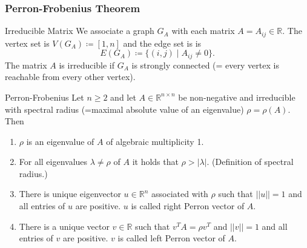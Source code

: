 \documentclass{panikzettel}
\begin{document}

\subsubsection{Perron-Frobenius Theorem}

\begin{defi}{Irreducible Matrix}
We associate a graph $G_A$ with each matrix $A=A_{ij}\in\mathbb{R}$. The vertex set is $V(G_A)\coloneqq [1,n]$ and the edge set is is
\[
E(G_A)\coloneqq \{(i,j)\mid A_{ij}\neq 0 \}.
\]
The matrix $A$ is irreducible if $G_A$ is strongly connected (= every vertex is reachable from every other vertex).
\end{defi}

\begin{theo}{Perron-Frobenius}
Let $n\geq 2$ and let $A\in\mathbb{R}^{n\times n}$ be non-negative and irreducible with spectral radius (=maximal absolute value of an eigenvalue) $\rho=\rho(A)$. Then
\begin{enumerate}
\item $\rho$ is an eigenvalue of $A$ of algebraic multiplicity 1.
\item For all eigenvalues $\lambda\neq \rho$ of $A$ it holds that $\rho > |\lambda|$. (Definition of spectral radius.)
\item There is unique eigenvector $u\in\mathbb{R}^n$ associated with $\rho$ such that $||u||=1$ and all entries of $u$ are positive. $u$ is called right Perron vector of $A$.
\item There is a unique vector $v\in\mathbb{R}$ such that $v^TA=\rho v^T$ and $||v||=1$ and all entries of $v$ are positive. $v$ is called left Perron vector of $A$.
\end{enumerate}
\end{theo}
\end{document}
